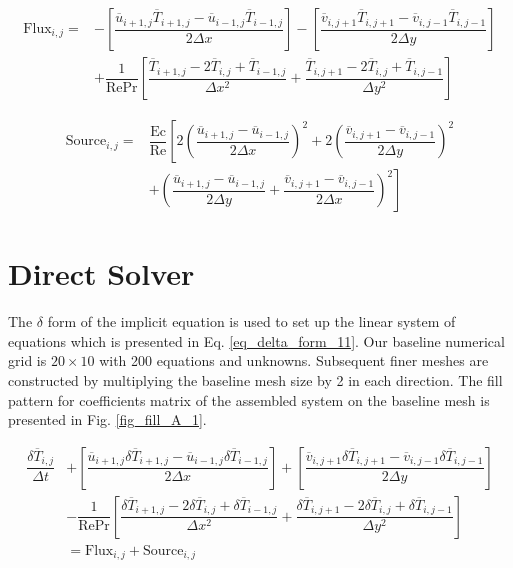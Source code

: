 \documentclass{article}
\begin{document}
\begin{equation}
\label{eq_fuck_1234}
\begin{split}
\text{Flux}_{i,j}=&-\left[ \dfrac{\overline{u}_{i+1,j} \overline{T}_{i+1,j} -\overline{u}_{i-1,j} \overline{T}_{i-1,j}}{2 \Delta x} \right]  -\left[ \dfrac{\overline{v}_{i,j+1} \overline{T}_{i,j+1} -\overline{v}_{i,j-1} \overline{T}_{i,j-1}}{2 \Delta y} \right] \\
&+\dfrac{1}{\text{Re}\text{Pr}} \left[ \dfrac{\overline{T}_{i+1,j}-2\overline{T}_{i,j} +\overline{T}_{i-1,j}}{\Delta x^2} +\dfrac{\overline{T}_{i,j+1}-2\overline{T}_{i,j}+\overline{T}_{i,j-1}}{\Delta y^2}\right]
\end{split}
\end{equation}

\begin{equation}
\label{eq_fuck_123as4}
\begin{split}
\text{Source}_{i,j}=&\dfrac{\text{Ec}}{\text{Re}} \left[ 2 \left( \dfrac{\overline{u}_{i+1,j} -\overline{u}_{i-1,j}   }{2 \Delta x} \right)^2    +2 \left( \dfrac{\overline{v}_{i,j+1} -\overline{v}_{i,j-1}   }{2 \Delta y} \right)^2 \right.\\
&\left.     +\left( \dfrac{\overline{u}_{i+1,j} -\overline{u}_{i-1,j}   }{2 \Delta y} + \dfrac{\overline{v}_{i,j+1} -\overline{v}_{i,j-1}   }{2 \Delta x} \right)^2  \right]
\end{split}
\end{equation}

\section{Direct Solver}
The $\delta$ form of the implicit equation is used to set up the linear system of equations which is presented in Eq. \ref{eq_delta_form_11}. Our baseline numerical grid is $20 \times 10$ with 200 equations and unknowns. Subsequent finer meshes are constructed by multiplying the baseline mesh size by 2 in each direction. The fill pattern for coefficients matrix of the assembled system on the baseline mesh is presented in Fig. \ref{fig_fill_A_1}.

\begin{equation}
\label{eq_delta_form_11}
\begin{split}
\dfrac{\delta \overline{T}_{i,j}}{\Delta t}&+\left[ \dfrac{\overline{u}_{i+1,j} \delta\overline{T}_{i+1,j} -\overline{u}_{i-1,j} \delta\overline{T}_{i-1,j}}{2 \Delta x} \right]  +\left[ \dfrac{\overline{v}_{i,j+1} \delta\overline{T}_{i,j+1} -\overline{v}_{i,j-1} \delta\overline{T}_{i,j-1}}{2 \Delta y} \right] \\
&-\dfrac{1}{\text{Re}\text{Pr}} \left[ \dfrac{\delta\overline{T}_{i+1,j}-2\delta\overline{T}_{i,j} +\delta\overline{T}_{i-1,j}}{\Delta x^2} +\dfrac{\delta\overline{T}_{i,j+1}-2\delta\overline{T}_{i,j}+\delta\overline{T}_{i,j-1}}{\Delta y^2}\right]\\
&=\text{Flux}_{i,j}+\text{Source}_{i,j}
\end{split}
\end{equation}
\end{document}
